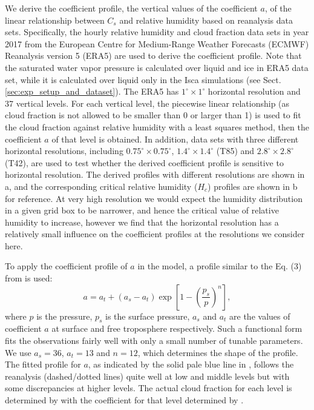 We derive the coefficient profile, the vertical values of the coefficient $a$, of the linear relationship between $C_s$ and relative humidity based on reanalysis data sets. Specifically, the hourly relative humidity and cloud fraction data sets in year 2017 from the European Centre for Medium-Range Weather Forecasts (ECMWF) Reanalysis version 5 (ERA5) \citep{era5} are used to derive the coefficient profile. Note that the saturated water vapor pressure is calculated over liquid and ice in ERA5 data set, while it is calculated over liquid only in the Isca simulations (see Sect.\ref{sec:exp_setup_and_dataset}). The ERA5 has $1^{\circ}\times 1^{\circ}$ horizontal resolution and 37 vertical levels. For each vertical level, the piecewise linear relationship (as cloud fraction is not allowed to be smaller than 0 or larger than 1) is used to fit the cloud fraction against relative humidity with a least squares method, then the coefficient $a$ of that level is obtained. In addition, data sets with three different horizontal resolutions, including $0.75^{\circ}\times 0.75^{\circ}$, $1.4^{\circ}\times 1.4^{\circ}$ (T85) and $2.8^{\circ}\times 2.8^{\circ}$ (T42), are used to test whether the derived coefficient profile is sensitive to horizontal resolution. The derived profiles with different resolutions are shown in a, and the corresponding critical relative humidity ($H_c$) profiles are shown in b for reference. At very high resolution we would expect the humidity distribution in a given grid box to be narrower, and hence the critical value of relative humidity to increase, however we find that the horizontal resolution has a relatively small influence on the coefficient profiles at the resolutions we consider here. 

To apply the coefficient profile of $a$ in the model, a profile similar to the Eq. (3) from \citet{Quaas2012} is used: %
\begin{equation}
	a = a_t + (a_s-a_t)\exp{\left[1-\left( \frac{p_s}{p} \right)^{n} \right]},
	\label{eq:linear_coeff_a}
\end{equation}
where $p$ is the pressure, $p_s$ is the surface pressure, $a_s$ and $a_t$ are the values of coefficient $a$ at surface and free troposphere respectively. Such a functional form fits the observations fairly well with only a small number of tunable parameters. We use $a_s=36$, $a_t=13$ and $n=12$, which determines the shape of the profile. The fitted profile for $a$, as indicated by the solid pale blue line in , follows the reanalysis (dashed/dotted lines) quite well at low and middle levels but with some discrepancies at higher levels. The actual cloud fraction for each level is determined by with the coefficient for that level determined by .


